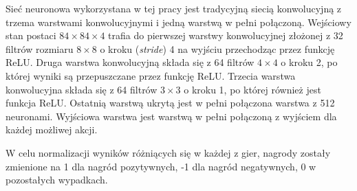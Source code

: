 \documentclass[12pt]{article}
\begin{document}
Sieć neuronowa wykorzystana w tej pracy jest tradycyjną siecią konwolucyjną z trzema warstwami konwolucyjnymi i jedną warstwą w pełni połączoną. Wejściowy stan postaci $84\times84\times4$ trafia do pierwszej warstwy konwolucyjnej złożonej z 32 filtrów rozmiaru $8\times8$ o kroku (\textit{stride}) 4 na wyjściu przechodząc przez funkcję ReLU. Druga warstwa konwolucyjną składa się z 64 filtrów $4\times4$ o kroku 2, po której wyniki są przepuszczane przez funkcję ReLU. Trzecia warstwa konwolucyjna składa się z 64 filtrów $3\times3$ o kroku 1, po której również jest funkcja ReLU. Ostatnią warstwą ukrytą jest w pełni połączona warstwa z 512 neuronami. Wyjściowa warstwa jest warstwą w pełni połączoną z wyjściem dla każdej możliwej akcji.

W celu normalizacji wyników różniących się w każdej z gier, nagrody zostały zmienione na 1 dla nagród pozytywnych, -1 dla nagród negatywnych, 0 w pozostałych wypadkach.
\end{document}
